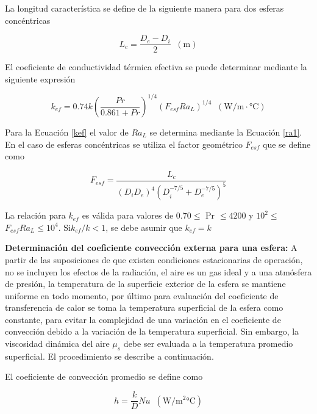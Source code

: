 La longitud característica se define de la siguiente manera para dos esferas concéntricas

\begin{equation}\label{lc}
    L_{c}=\frac{D_{e}-D_{i}}{2}\;\;(\si{\meter})
\end{equation}

El coeficiente de conductividad térmica efectiva se puede determinar mediante la siguiente expresión

\begin{equation}\label{kef}
    k_{ef}=0.74k\left ( \frac{Pr}{0.861+Pr} \right )^{1/4}(F_{esf}Ra_{L})^{1/4} \; \; (\si{\watt/\meter\cdot\celsius})
\end{equation}

Para la Ecuación \ref{kef} el valor de $Ra_{L}$ se determina mediante la Ecuación \ref{ra1}. En el caso de esferas concéntricas se utiliza el factor geométrico $F_{esf}$ que se define como

\begin{equation}\label{fesf}
    F_{esf}=\frac{L_{c}}{(D_{i}D_{e})^{4}(D_{i}^{-7/5}+D_{e}^{-7/5})^{5}}
\end{equation}

La relación para  $k_{ef}$ es válida para valores de {$0.70 \leq$ Pr $\leq 4200$}\; $\textrm{y}$ \; {$10^{2}\leq$ $F_{esf}Ra_{L}\leq 10^{4}$}.\;\; $\textrm{Si}$\;\;$k_{ef}/k<1$, se debe asumir que $k_{ef}=k$

\textbf{Determinación del coeficiente convección externa para una esfera:} A partir de las suposiciones de que existen condiciones estacionarias de operación, no se incluyen los efectos de la radiación, el aire es un gas ideal y a una atmósfera de presión, la temperatura de la superficie exterior de la esfera se mantiene uniforme en todo momento, por último para evaluación del coeficiente de transferencia de calor se toma la temperatura superficial de la esfera como constante, para evitar la complejidad de una variación en el coeficiente de convección debido a la variación de la temperatura superficial. Sin embargo, la viscosidad dinámica del aire $\mu _{s}$ debe ser evaluada a la temperatura promedio superficial. El procedimiento se describe a continuación. \cite{cengel}

El coeficiente de convección promedio se define como

\begin{equation}\label{hext}
    h=\frac{k}{D}Nu\; \; (\si{\watt/\square\meter\celsius})
\end{equation}

